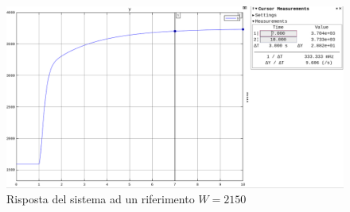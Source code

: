 \documentclass[a4paper,12pt,italian]{article}
\begin{document}
\begin{figure}[h!]
    \begin{center}
        \includegraphics[scale=0.35]{img/variazioni_W.png}
        \caption{Risposta del sistema ad un riferimento $W = 2150$}
    \end{center}
\end{figure}
\end{document}
